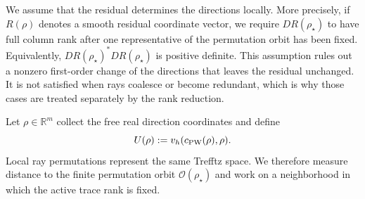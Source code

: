 \documentclass[pdflatex,sn-mathphys-num]{sn-jnl}
\theoremstyle{thmstyleone}
\theoremstyle{thmstyletwo}
\begin{document}
We assume that the residual determines the directions locally.  More precisely, if $R(\rho)$ denotes a smooth residual coordinate vector, we require $DR(\rho_\star)$ to have full column rank after one representative of the permutation orbit has been fixed.  Equivalently, $DR(\rho_\star)^*DR(\rho_\star)$ is positive definite.  This assumption rules out a nonzero first-order change of the directions that leaves the residual unchanged.  It is not satisfied when rays coalesce or become redundant, which is why those cases are treated separately by the rank reduction.

Let $\rho\in\mathbb R^m$ collect the free real direction coordinates and define
\[
 U(\rho):=v_h(c_{\rm PW}(\rho),\rho).
\]
Local ray permutations represent the same Trefftz space.  We therefore measure distance to the finite permutation orbit $\mathcal O(\rho_\star)$ and work on a neighborhood in which the active trace rank is fixed.
\end{document}
